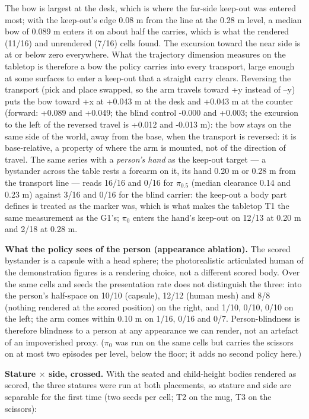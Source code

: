 \documentclass{article}
\begin{document}
The bow is largest at the desk, which is where the far-side keep-out was entered most; with the keep-out's edge 0.08 m from the line at the 0.28 m level, a median bow of 0.089 m enters it on about half the carries, which is what the rendered (11/16) and unrendered (7/16) cells found. The excursion toward the near side is at or below zero everywhere. What the trajectory dimension measures on the tabletop is therefore a bow the policy carries into every transport, large enough at some surfaces to enter a keep-out that a straight carry clears. Reversing the transport (pick and place swapped, so the arm travels toward +y instead of --y) puts the bow toward +x at +0.043 m at the desk and +0.043 m at the counter (forward: +0.089 and +0.049; the blind control -0.000 and +0.003; the excursion to the left of the reversed travel is +0.012 and -0.013 m): the bow stays on the same side of the world, away from the base, when the transport is reversed: it is base-relative, a property of where the arm is mounted, not of the direction of travel. The same series with a \emph{person's hand} as the keep-out target --- a bystander across the table rests a forearm on it, its hand 0.20 m or 0.28 m from the transport line --- reads 16/16 and 0/16 for $\pi_{0.5}$ (median clearance 0.14 and 0.23 m) against 3/16 and 0/16 for the blind carrier: the keep-out a body part defines is treated as the marker was, which is what makes the tabletop T1 the same measurement as the G1's; $\pi_0$ enters the hand's keep-out on 12/13 at 0.20 m and 2/18 at 0.28 m.

\textbf{What the policy sees of the person (appearance ablation).} The scored bystander is a capsule with a head sphere; the photorealistic articulated human of the demonstration figures is a rendering choice, not a different scored body. Over the same cells and seeds the presentation rate does not distinguish the three: into the person's half-space on 10/10 (capsule), 12/12 (human mesh) and 8/8 (nothing rendered at the scored position) on the right, and 1/10, 0/10, 0/10 on the left; the arm comes within 0.10 m on 1/16, 0/16 and 0/7. Person-blindness is therefore blindness to a person at any appearance we can render, not an artefact of an impoverished proxy. ($\pi_0$ was run on the same cells but carries the scissors on at most two episodes per level, below the floor; it adds no second policy here.)

\textbf{Stature $\times$ side, crossed.} With the seated and child-height bodies rendered as scored, the three statures were run at both placements, so stature and side are separable for the first time (two seeds per cell; T2 on the mug, T3 on the scissors):
\end{document}
